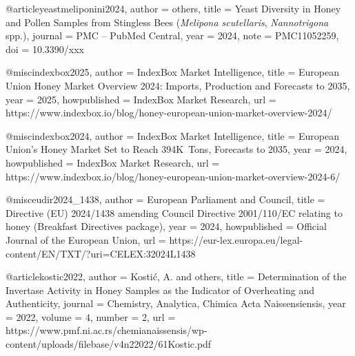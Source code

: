 @article{yeastmeliponini2024,
  author  = {others},
  title   = {{Yeast Diversity in Honey and Pollen Samples from
              Stingless Bees (\textit{Melipona scutellaris},
              \textit{Nannotrigona} spp.)}},
  journal = {PMC -- PubMed Central},
  year    = {2024},
  note    = {PMC11052259},
  doi     = {10.3390/xxx}
}







@misc{indexbox2025,
  author       = {{IndexBox Market Intelligence}},
  title        = {{European Union Honey Market Overview 2024: Imports,
                   Production and Forecasts to 2035}},
  year         = {2025},
  howpublished = {IndexBox Market Research},
  url          = {https://www.indexbox.io/blog/honey-european-union-market-overview-2024/}
}

@misc{indexbox2024,
  author       = {{IndexBox Market Intelligence}},
  title        = {{European Union's Honey Market Set to Reach 394K~Tons,
                   Forecasts to 2035}},
  year         = {2024},
  howpublished = {IndexBox Market Research},
  url          = {https://www.indexbox.io/blog/honey-european-union-market-overview-2024-6/}
}






@misc{eudir2024_1438,
  author       = {{European Parliament and Council}},
  title        = {{Directive (EU) 2024/1438 amending Council Directive 2001/110/EC
                   relating to honey (Breakfast Directives package)}},
  year         = {2024},
  howpublished = {Official Journal of the European Union},
  url          = {https://eur-lex.europa.eu/legal-content/EN/TXT/?uri=CELEX:32024L1438}
}








@article{kostic2022,
  author  = {Kosti{\'c}, A. and others},
  title   = {{Determination of the Invertase Activity in Honey
              Samples as the Indicator of Overheating and
              Authenticity}},
  journal = {Chemistry, Analytica, Chimica Acta Naissensiensis},
  year    = {2022},
  volume  = {4},
  number  = {2},
  url     = {https://www.pmf.ni.ac.rs/chemianaissensis/wp-content/uploads/filebase/v4n22022/61Kostic.pdf}
}




